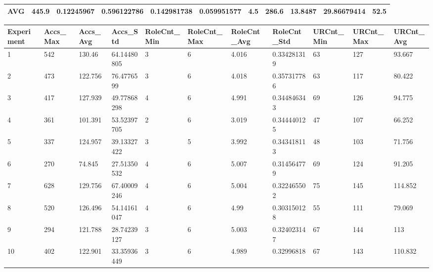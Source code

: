 \begin{table}[H]
\begin{adjustbox}{max width=380pt,keepaspectratio,angle=90}
\begin{tabular}{|l|l|l|l|l|l|l|l|l|l|l|}
						AVG        & 445.9 & 0.12245967   & 0.596122786  & 0.142981738  & 0.059951577  & 4.5       & 286.6     & 13.8487   & 29.86679414 & 52.5      \\ \hline
					\end{tabular}
				\end{adjustbox}
				\begin{adjustbox}{max width=380pt,keepaspectratio,angle=90}
					\begin{tabular}{|l|l|l|l|l|l|l|l|l|l|l|}
						\rowcolor[HTML]{EFEFEF} 
						\hline
						Experiment & Accs\_Max & Accs\_Avg & Accs\_Std   & RoleCnt\_Min & RoleCnt\_Max & RoleCnt\_Avg & RoleCnt\_Std & URCnt\_Min & URCnt\_Max & URCnt\_Avg \\ \hline
						1          & 542       & 130.46    & 64.14480805 & 3            & 6            & 4.016        & 0.334281319  & 63         & 127        & 93.667     \\ \hline
						2          & 473       & 122.756   & 76.4776599  & 3            & 6            & 4.018        & 0.357317786  & 63         & 117        & 80.422     \\ \hline
						3          & 417       & 127.939   & 49.77868298 & 4            & 6            & 4.991        & 0.344846343  & 69         & 126        & 94.775     \\ \hline
						4          & 361       & 101.391   & 53.52397705 & 2            & 6            & 3.019        & 0.344440125  & 47         & 107        & 66.252     \\ \hline
						5          & 337       & 124.957   & 39.13327422 & 3            & 5            & 3.992        & 0.343418113  & 48         & 103        & 71.756     \\ \hline
						6          & 270       & 74.845    & 27.51350532 & 4            & 6            & 5.007        & 0.314564779  & 69         & 124        & 91.205     \\ \hline
						7          & 628       & 129.756   & 67.40009246 & 4            & 6            & 5.004        & 0.322465502  & 75         & 145        & 114.852    \\ \hline
						8          & 520       & 126.496   & 54.14161047 & 4            & 6            & 4.99         & 0.303150128  & 55         & 111        & 79.069     \\ \hline
						9          & 294       & 121.788   & 28.74239127 & 3            & 6            & 5.003        & 0.324023147  & 67         & 144        & 113        \\ \hline
						10         & 402       & 122.901   & 33.35936449 & 3            & 6            & 4.989        & 0.32996818   & 67         & 143        & 110.832    \\ \hline\hline

\end{tabular}
\end{adjustbox}
\end{table}
